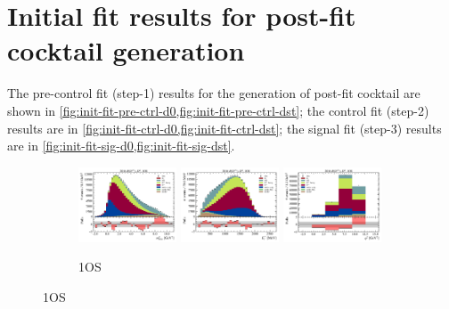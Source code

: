 \section{Initial fit results for post-fit cocktail generation}
\label{appx:suppl:init-fit-cocktail}

The pre-control fit (step-1) results for the generation of post-fit cocktail
are shown in \cref{fig:init-fit-pre-ctrl-d0,fig:init-fit-pre-ctrl-dst};
the control fit (step-2) results are in
\cref{fig:init-fit-ctrl-d0,fig:init-fit-ctrl-dst};
the signal fit (step-3) results are in
\cref{fig:init-fit-sig-d0,fig:init-fit-sig-dst}.

\begin{figure}[htb]
    \centering
    \begin{subfigure}{\textwidth}
        \includegraphics[width=0.32\textwidth]{./figs-supplemental-plots/init-fit/pre-ctrl/fit_result-stacked-D0-1os-mmiss2.pdf}
        \includegraphics[width=0.32\textwidth]{./figs-supplemental-plots/init-fit/pre-ctrl/fit_result-stacked-D0-1os-el.pdf}
        \includegraphics[width=0.32\textwidth]{./figs-supplemental-plots/init-fit/pre-ctrl/fit_result-stacked-D0-1os-q2.pdf}
        \caption{1OS}
    \end{subfigure}


\end{figure}
